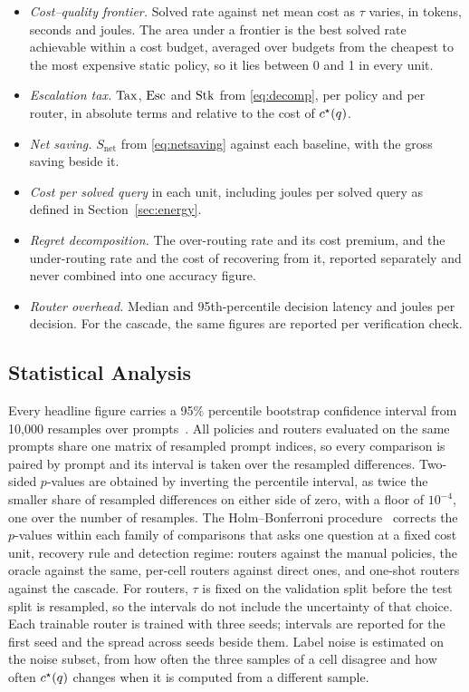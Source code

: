 \begin{itemize}
  \item \emph{Cost--quality frontier.} Solved rate against net mean cost as
        $\tau$ varies, in tokens, seconds and joules. The area under a
        frontier is the best solved rate achievable within a cost budget,
        averaged over budgets from the cheapest to the most expensive static
        policy, so it lies between 0 and 1 in every unit.
  \item \emph{Escalation tax.} $\mathrm{Tax}$, $\mathrm{Esc}$ and $\mathrm{Stk}$ from
        \eqref{eq:decomp}, per policy and per router, in absolute terms and
        relative to the cost of $c^{\star}(q)$.
  \item \emph{Net saving.} $S_{\mathrm{net}}$ from \eqref{eq:netsaving}
        against each baseline, with the gross saving beside it.
  \item \emph{Cost per solved query} in each unit, including joules per
        solved query as defined in Section~\ref{sec:energy}.
  \item \emph{Regret decomposition.} The over-routing rate and its cost
        premium, and the under-routing rate and the cost of recovering from
        it, reported separately and never combined into one accuracy figure.
  \item \emph{Router overhead.} Median and 95th-percentile decision latency
        and joules per decision. For the cascade, the same figures are
        reported per verification check.
\end{itemize}

\subsection{Statistical Analysis}
\label{sec:stats}

Every headline figure carries a 95\% percentile bootstrap confidence
interval from 10{,}000 resamples over prompts~\cite{efron1993bootstrap}. All policies and routers evaluated on the same
prompts share one matrix of resampled prompt indices, so every comparison is
paired by prompt and its interval is taken over the resampled differences.
Two-sided $p$-values are obtained by inverting the percentile interval, as
twice the smaller share of resampled differences on either side of zero,
with a floor of $10^{-4}$, one over the number of resamples. The
Holm--Bonferroni procedure~\cite{holm1979simple} corrects the $p$-values
within each family of comparisons that asks one question at a fixed cost
unit, recovery rule and detection regime: routers against the manual
policies, the oracle against the same, per-cell routers against direct
ones, and one-shot routers against the cascade. For
routers, $\tau$ is fixed on the validation split before the test split is
resampled, so the intervals do not include the uncertainty of that choice.
Each trainable router is trained with three seeds; intervals are reported
for the first seed and the spread across seeds beside them. Label noise is
estimated on the noise subset, from how often the three samples of a cell
disagree and how often $c^{\star}(q)$ changes when it is computed from a
different sample.

